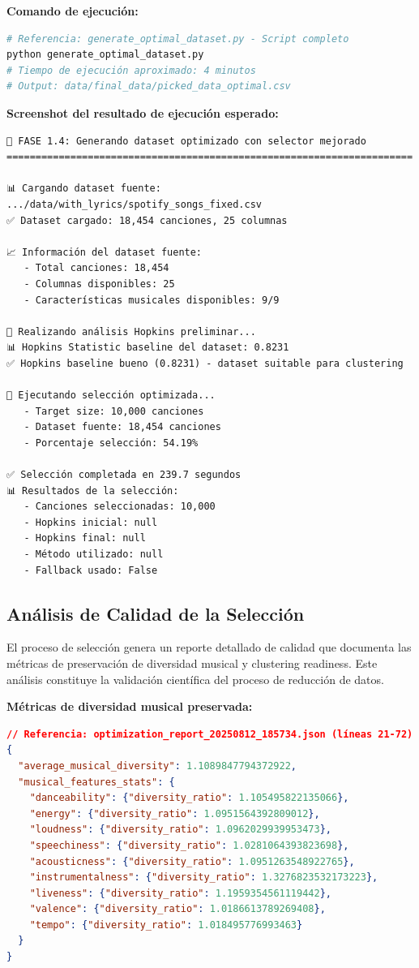 \documentclass[12pt,a4paper]{article}
\begin{document}
\textbf{Comando de ejecución:}
\begin{lstlisting}[language=bash]
# Referencia: generate_optimal_dataset.py - Script completo
python generate_optimal_dataset.py
# Tiempo de ejecución aproximado: 4 minutos
# Output: data/final_data/picked_data_optimal.csv
\end{lstlisting}

\textbf{Screenshot del resultado de ejecución esperado:}
\begin{lstlisting}
🚀 FASE 1.4: Generando dataset optimizado con selector mejorado
======================================================================

📊 Cargando dataset fuente: .../data/with_lyrics/spotify_songs_fixed.csv
✅ Dataset cargado: 18,454 canciones, 25 columnas

📈 Información del dataset fuente:
   - Total canciones: 18,454
   - Columnas disponibles: 25
   - Características musicales disponibles: 9/9

🧪 Realizando análisis Hopkins preliminar...
📊 Hopkins Statistic baseline del dataset: 0.8231
✅ Hopkins baseline bueno (0.8231) - dataset suitable para clustering

🎯 Ejecutando selección optimizada...
   - Target size: 10,000 canciones
   - Dataset fuente: 18,454 canciones
   - Porcentaje selección: 54.19%

✅ Selección completada en 239.7 segundos
📊 Resultados de la selección:
   - Canciones seleccionadas: 10,000
   - Hopkins inicial: null
   - Hopkins final: null
   - Método utilizado: null
   - Fallback usado: False
\end{lstlisting}

\subsection{Análisis de Calidad de la Selección}

El proceso de selección genera un reporte detallado de calidad que documenta las métricas de preservación de diversidad musical y clustering readiness. Este análisis constituye la validación científica del proceso de reducción de datos.

\textbf{Métricas de diversidad musical preservada:}
\begin{lstlisting}[language=json]
// Referencia: optimization_report_20250812_185734.json (líneas 21-72)
{
  "average_musical_diversity": 1.1089847794372922,
  "musical_features_stats": {
    "danceability": {"diversity_ratio": 1.105495822135066},
    "energy": {"diversity_ratio": 1.0951564392809012},
    "loudness": {"diversity_ratio": 1.0962029939953473},
    "speechiness": {"diversity_ratio": 1.0281064393823698},
    "acousticness": {"diversity_ratio": 1.0951263548922765},
    "instrumentalness": {"diversity_ratio": 1.3276823532173223},
    "liveness": {"diversity_ratio": 1.1959354561119442},
    "valence": {"diversity_ratio": 1.0186613789269408},
    "tempo": {"diversity_ratio": 1.018495776993463}
  }
}
\end{lstlisting}
\end{document}
